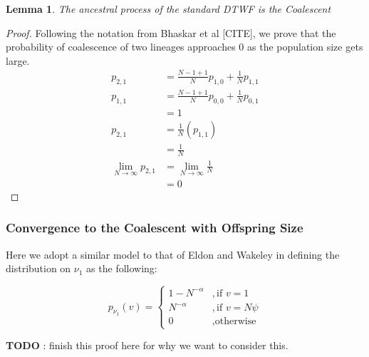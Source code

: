 \documentclass[11pt]{article}
\newtheorem{lemma}{Lemma}
\begin{document}
\begin{lemma}
	The ancestral process of the standard DTWF is the Coalescent
\end{lemma}

\begin{proof}
	Following the notation from Bhaskar et al [CITE], we prove that the probability of coalescence of two lineages approaches $0$ as the population size gets large. 	
	$$
	\begin{aligned}
		p_{2,1} &= \frac{N-1+1}{N}p_{1,0} + \frac{1}{N}p_{1,1}\\
		p_{1,1} &= \frac{N-1+1}{N}p_{0,0} + \frac{1}{N}p_{0,1}\\
		&= 1\\
		p_{2,1} &= \frac{1}{N}(p_{1,1})\\
		&= \frac{1}{N}\\
		\lim_{N\to\infty} p_{2,1} &= \lim_{N\to\infty} \frac{1}{N}\\
		&= 0
	\end{aligned}
	$$
\end{proof}

\subsubsection{Convergence to the Coalescent with Offspring Size}

Here we adopt a similar model to that of Eldon and Wakeley in defining the distribution on $\nu_1$ as the following:

$$
p_{\nu_1}(v) =
\begin{cases}
	1 - N^{-\alpha} &, \text{if  } v = 1\\
	N^{-\alpha} &, \text{if  } v = N\psi\\
	0 &, \text{otherwise}
\end{cases}
$$

\textbf{TODO} : finish this proof here for why we want to consider this.
\end{document}
